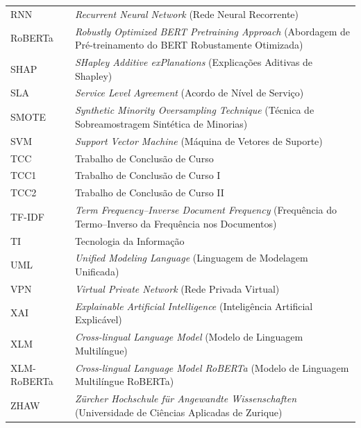 \documentclass[
    12pt,                %
    openright,           %
    oneside,             %
    a4paper,             %
    english,             %
    brazil               %
]{abntex2}
\begin{document}
\begin{longtable}{@{}p{3.8cm}p{}@{}}
RNN & \textit{Recurrent Neural Network} (Rede Neural Recorrente) \\
RoBERTa & \textit{Robustly Optimized BERT Pretraining Approach} (Abordagem de Pré-treinamento do BERT Robustamente Otimizada) \\
SHAP & \textit{SHapley Additive exPlanations} (Explicações Aditivas de Shapley) \\
SLA & \textit{Service Level Agreement} (Acordo de Nível de Serviço) \\
SMOTE & \textit{Synthetic Minority Oversampling Technique} (Técnica de Sobreamostragem Sintética de Minorias) \\
SVM & \textit{Support Vector Machine} (Máquina de Vetores de Suporte) \\
TCC & Trabalho de Conclusão de Curso \\
TCC1 & Trabalho de Conclusão de Curso I \\
TCC2 & Trabalho de Conclusão de Curso II \\
TF-IDF & \textit{Term Frequency–Inverse Document Frequency} (Frequência do Termo–Inverso da Frequência nos Documentos) \\
TI & Tecnologia da Informação \\
UML & \textit{Unified Modeling Language} (Linguagem de Modelagem Unificada) \\
VPN & \textit{Virtual Private Network} (Rede Privada Virtual) \\
XAI & \textit{Explainable Artificial Intelligence} (Inteligência Artificial Explicável) \\
XLM & \textit{Cross-lingual Language Model} (Modelo de Linguagem Multilíngue) \\
XLM-RoBERTa & \textit{Cross-lingual Language Model RoBERTa} (Modelo de Linguagem Multilíngue RoBERTa) \\
ZHAW & \textit{Zürcher Hochschule für Angewandte Wissenschaften} (Universidade de Ciências Aplicadas de Zurique) \\
\end{longtable}

\cleardoublepage

\tableofcontents*
\cleardoublepage

\textual
\end{document}
